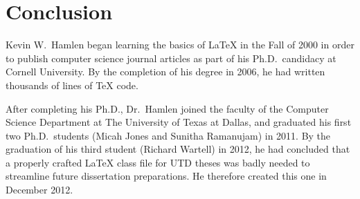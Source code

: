 \documentclass[doublespacing]{utdthesis}
\begin{document}
\chapter{Conclusion}
\label{c:conclusion}

\appendix %


\begin{thesisbib}  %



\end{thesisbib}  %


\begin{biosketch}
Kevin W.~Hamlen began learning the basics of \LaTeX{} in the Fall of 2000 in
order to publish computer science journal articles as part of his
Ph.D.~candidacy at Cornell University.
By the completion of his degree in 2006, he had written thousands of lines of
\TeX{} code.

After completing his Ph.D., Dr.~Hamlen joined the faculty of the Computer
Science Department at The University of Texas at Dallas, and graduated his
first two Ph.D.~students (Micah Jones and Sunitha Ramanujam) in 2011.
By the graduation of his third student (Richard Wartell) in 2012, he had
concluded that a properly crafted \LaTeX{} class file for UTD theses was badly
needed to streamline future dissertation preparations.
He therefore created this one in December 2012.
\end{biosketch}


\begin{vita}  %
\end{vita}  %
\end{document}
